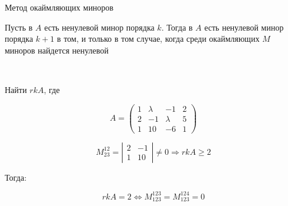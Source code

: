 \bigskip


\begin{theorem} Метод окаймляющих миноров
    
    Пусть в $A$ есть ненулевой минор порядка $k$. Тогда в $A$ есть ненулевой минор порядка $k + 1$ в том, и только в том случае, когда среди окаймляющих $M$ миноров найдется ненулевой

    \begin{comment}
    
        На $k$-ом шаге достаточно перебрать $(m - k) \cdot (n - k)$ миноров

    \end{comment}

\end{theorem}


\bigskip


\begin{problem}~
    
    Найти $rk A$, где

    $$A = \begin{pmatrix}
        1 & \lambda & -1 & 2 \\
        2 & -1 & \lambda & 5 \\
        1 & 10 & -6 & 1
    \end{pmatrix}$$

    $$M_{23}^{12} = \left|
        \begin{matrix}
            2 & -1 \\
            1 & 10
        \end{matrix}
    \right| \not= 0 \Rightarrow rk A \geq 2$$

    Тогда:

    $$rk A = 2 \Leftrightarrow M_{123}^{123} = M_{123}^{124} = 0$$

\end{problem}


\bigskip


